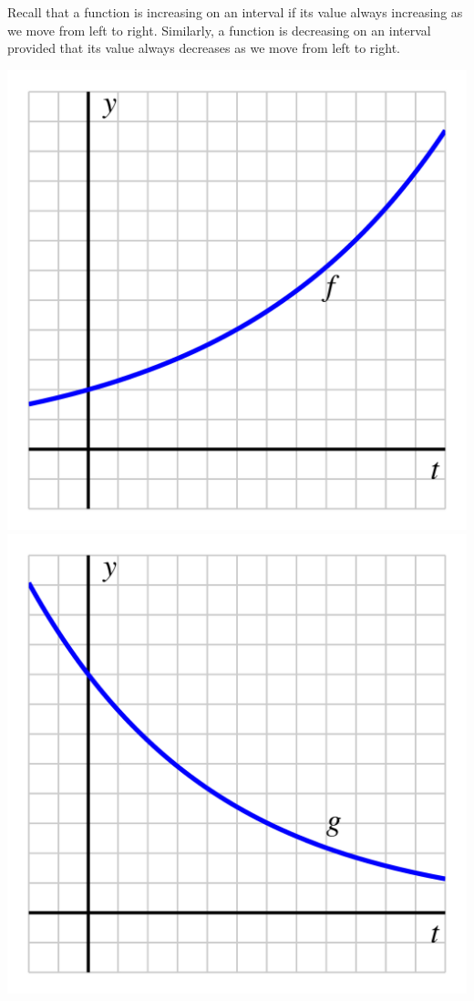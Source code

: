 \documentclass[nooutcomes]{ximera}
\begin{document}

Recall that a function is increasing on an interval if its value always increasing as we move from left to right.  Similarly, a function is decreasing on an interval provided that its value always decreases as we move from left to right.

\begin{image}
\includegraphics{growth-incr-CCU.jpg}
\includegraphics{growth-decr-CCU.jpg}
\end{image}
\end{document}
